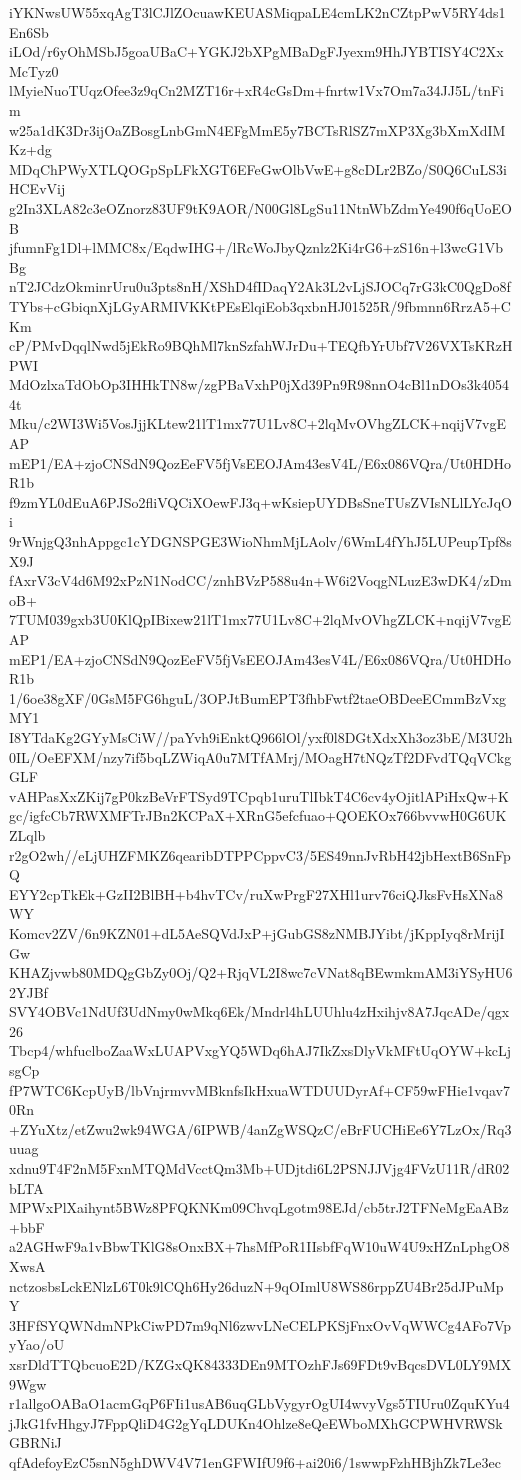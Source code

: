 iYKNwsUW55xqAgT3lCJlZOcuawKEUASMiqpaLE4cmLK2nCZtpPwV5RY4ds1En6Sb
iLOd/r6yOhMSbJ5goaUBaC+YGKJ2bXPgMBaDgFJyexm9HhJYBTISY4C2XxMcTyz0
lMyieNuoTUqzOfee3z9qCn2MZT16r+xR4cGsDm+fnrtw1Vx7Om7a34JJ5L/tnFim
w25a1dK3Dr3ijOaZBosgLnbGmN4EFgMmE5y7BCTsRlSZ7mXP3Xg3bXmXdIMKz+dg
MDqChPWyXTLQOGpSpLFkXGT6EFeGwOlbVwE+g8cDLr2BZo/S0Q6CuLS3iHCEvVij
g2In3XLA82c3eOZnorz83UF9tK9AOR/N00Gl8LgSu11NtnWbZdmYe490f6qUoEOB
jfumnFg1Dl+lMMC8x/EqdwIHG+/lRcWoJbyQznlz2Ki4rG6+zS16n+l3wcG1VbBg
nT2JCdzOkminrUru0u3pts8nH/XShD4fIDaqY2Ak3L2vLjSJOCq7rG3kC0QgDo8f
TYbs+cGbiqnXjLGyARMIVKKtPEsElqiEob3qxbnHJ01525R/9fbmnn6RrzA5+CKm
cP/PMvDqqlNwd5jEkRo9BQhMl7knSzfahWJrDu+TEQfbYrUbf7V26VXTsKRzHPWI
MdOzlxaTdObOp3IHHkTN8w/zgPBaVxhP0jXd39Pn9R98nnO4cBl1nDOs3k40544t
Mku/c2WI3Wi5VosJjjKLtew21lT1mx77U1Lv8C+2lqMvOVhgZLCK+nqijV7vgEAP
mEP1/EA+zjoCNSdN9QozEeFV5fjVsEEOJAm43esV4L/E6x086VQra/Ut0HDHoR1b
f9zmYL0dEuA6PJSo2fliVQCiXOewFJ3q+wKsiepUYDBsSneTUsZVIsNLlLYcJqOi
9rWnjgQ3nhAppgc1cYDGNSPGE3WioNhmMjLAolv/6WmL4fYhJ5LUPeupTpf8sX9J
fAxrV3cV4d6M92xPzN1NodCC/znhBVzP588u4n+W6i2VoqgNLuzE3wDK4/zDmoB+
7TUM039gxb3U0KlQpIBixew21lT1mx77U1Lv8C+2lqMvOVhgZLCK+nqijV7vgEAP
mEP1/EA+zjoCNSdN9QozEeFV5fjVsEEOJAm43esV4L/E6x086VQra/Ut0HDHoR1b
1/6oe38gXF/0GsM5FG6hguL/3OPJtBumEPT3fhbFwtf2taeOBDeeECmmBzVxgMY1
I8YTdaKg2GYyMsCiW//paYvh9iEnktQ966lOl/yxf0l8DGtXdxXh3oz3bE/M3U2h
0IL/OeEFXM/nzy7if5bqLZWiqA0u7MTfAMrj/MOagH7tNQzTf2DFvdTQqVCkgGLF
vAHPasXxZKij7gP0kzBeVrFTSyd9TCpqb1uruTlIbkT4C6cv4yOjitlAPiHxQw+K
gc/igfcCb7RWXMFTrJBn2KCPaX+XRnG5efcfuao+QOEKOx766bvvwH0G6UKZLqlb
r2gO2wh//eLjUHZFMKZ6qearibDTPPCppvC3/5ES49nnJvRbH42jbHextB6SnFpQ
EYY2cpTkEk+GzII2BlBH+b4hvTCv/ruXwPrgF27XHl1urv76ciQJksFvHsXNa8WY
Komcv2ZV/6n9KZN01+dL5AeSQVdJxP+jGubGS8zNMBJYibt/jKppIyq8rMrijIGw
KHAZjvwb80MDQgGbZy0Oj/Q2+RjqVL2I8wc7cVNat8qBEwmkmAM3iYSyHU62YJBf
SVY4OBVc1NdUf3UdNmy0wMkq6Ek/Mndrl4hLUUhlu4zHxihjv8A7JqcADe/qgx26
Tbcp4/whfuclboZaaWxLUAPVxgYQ5WDq6hAJ7IkZxsDlyVkMFtUqOYW+kcLjsgCp
fP7WTC6KcpUyB/lbVnjrmvvMBknfsIkHxuaWTDUUDyrAf+CF59wFHie1vqav70Rn
+ZYuXtz/etZwu2wk94WGA/6IPWB/4anZgWSQzC/eBrFUCHiEe6Y7LzOx/Rq3uuag
xdnu9T4F2nM5FxnMTQMdVcctQm3Mb+UDjtdi6L2PSNJJVjg4FVzU11R/dR02bLTA
MPWxPlXaihynt5BWz8PFQKNKm09ChvqLgotm98EJd/cb5trJ2TFNeMgEaABz+bbF
a2AGHwF9a1vBbwTKlG8sOnxBX+7hsMfPoR1IIsbfFqW10uW4U9xHZnLphgO8XwsA
nctzosbsLckENlzL6T0k9lCQh6Hy26duzN+9qOImlU8WS86rppZU4Br25dJPuMpY
3HFfSYQWNdmNPkCiwPD7m9qNl6zwvLNeCELPKSjFnxOvVqWWCg4AFo7VpyYao/oU
xsrDldTTQbcuoE2D/KZGxQK84333DEn9MTOzhFJs69FDt9vBqcsDVL0LY9MX9Wgw
r1allgoOABaO1acmGqP6FIi1usAB6uqGLbVygyrOgUI4wvyVgs5TIUru0ZquKYu4
jJkG1fvHhgyJ7FppQliD4G2gYqLDUKn4Ohlze8eQeEWboMXhGCPWHVRWSkGBRNiJ
qfAdefoyEzC5snN5ghDWV4V71enGFWIfU9f6+ai20i6/1swwpFzhHBjhZk7Le3ec
